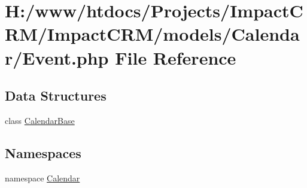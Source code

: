 \hypertarget{Event_8php}{
\section{H:/www/htdocs/Projects/ImpactCRM/ImpactCRM/models/Calendar/Event.php File Reference}
\label{Event_8php}
}
\subsection*{Data Structures}
\begin{DoxyCompactItemize}
\item 
class \hyperlink{classCalendarBase}{CalendarBase}
\end{DoxyCompactItemize}
\subsection*{Namespaces}
\begin{DoxyCompactItemize}
\item 
namespace \hyperlink{namespaceCalendar}{Calendar}
\end{DoxyCompactItemize}
